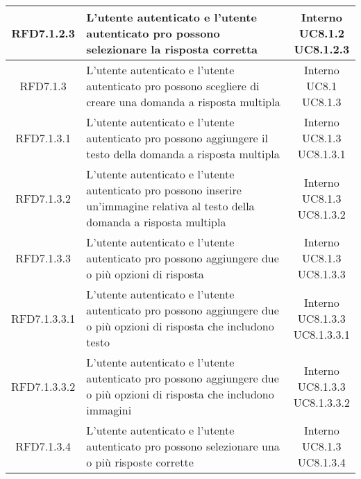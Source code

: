 \begin{longtable}{|c|>{\centering}m{7cm}|c|}
			 \hypertarget{{RFD7.1.2.3}}{{RFD7.1.2.3}} & L’utente autenticato e l’utente
autenticato pro possono selezionare la
risposta corretta & \makecell{Interno\\ UC8.1.2 \\UC8.1.2.3 } \\ \hline
			 \hypertarget{{RFD7.1.3}}{{RFD7.1.3}} & L’utente autenticato e l’utente
autenticato pro possono scegliere di
creare una domanda a risposta multipla & \makecell{Interno\\ UC8.1 \\UC8.1.3 } \\ \hline
			 \hypertarget{{RFD7.1.3.1}}{{RFD7.1.3.1}} & L’utente autenticato e l’utente
autenticato pro possono aggiungere il
testo della domanda a risposta multipla & \makecell{Interno\\ UC8.1.3 \\UC8.1.3.1 } \\ \hline
			 \hypertarget{{RFD7.1.3.2}}{{RFD7.1.3.2}} & L’utente autenticato e l’utente
autenticato pro possono inserire
un’immagine relativa al testo della
domanda a risposta multipla & \makecell{Interno\\ UC8.1.3 \\UC8.1.3.2 } \\ \hline
			 \hypertarget{{RFD7.1.3.3}}{{RFD7.1.3.3}} & L’utente autenticato e l’utente
autenticato pro possono aggiungere due o
più opzioni di risposta & \makecell{Interno\\ UC8.1.3 \\UC8.1.3.3 } \\ \hline
			 \hypertarget{{RFD7.1.3.3.1}}{{RFD7.1.3.3.1}} & L’utente autenticato e l’utente
autenticato pro possono aggiungere due o
più opzioni di risposta che includono testo & \makecell{Interno\\ UC8.1.3.3 \\UC8.1.3.3.1 } \\ \hline
			 \hypertarget{{RFD7.1.3.3.2}}{{RFD7.1.3.3.2}} & L’utente autenticato e l’utente autenticato pro possono aggiungere due o più opzioni di risposta che includono immagini & \makecell{Interno\\ UC8.1.3.3 \\UC8.1.3.3.2 } \\ \hline
			 \hypertarget{{RFD7.1.3.4}}{{RFD7.1.3.4}} & L’utente autenticato e l’utente
autenticato pro possono selezionare una o
più risposte corrette & \makecell{Interno\\ UC8.1.3 \\UC8.1.3.4 } \\ \hline

\end{longtable}
